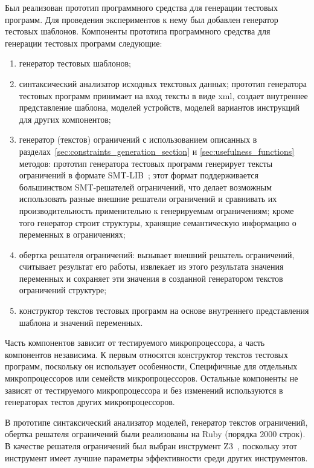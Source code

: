 Был реализован прототип программного средства для генерации тестовых программ. Для проведения экспериментов к нему был добавлен генератор тестовых шаблонов. Компоненты прототипа программного средства для генерации тестовых программ следующие: %
\begin{enumerate}
  \item генератор тестовых шаблонов;
  \item синтаксический анализатор исходных текстовых данных; прототип генератора тестовых программ принимает на вход тексты в виде xml, создает внутреннее представление шаблона, моделей устройств, моделей вариантов инструкций для других компонентов;
  \item генератор (текстов) ограничений с использованием описанных в разделах~\ref{sec:constraints_generation_section} и \ref{sec:usefulness_functions} методов: прототип генератора тестовых программ генерирует тексты ограничений в формате SMT-LIB~\cite{SMT}; этот формат поддерживается большинством SMT-решателей ограничений, что делает возможным использовать разные внешние решатели ограничений и сравнивать их производительность применительно к генерируемым ограничениям; кроме того генератор строит структуры, хранящие семантическую информацию о переменных в ограничениях;
  \item обертка решателя ограничений: вызывает внешний решатель ограничений, считывает результат его работы, извлекает из этого результата значения переменных и сохраняет эти значения в созданной генератором текстов ограничений структуре;
  \item конструктор текстов тестовых программ на основе внутреннего представления шаблона и значений переменных.
\end{enumerate}

Часть компонентов зависит от тестируемого микропроцессора, а часть компонентов независима. К первым относятся конструктор текстов тестовых программ, поскольку он использует особенности, Специфичные для отдельных микропроцессоров или семейств микропроцессоров. Остальные компоненты не зависят от тестируемого микропроцессора и без изменений используются в генераторах тестов других микропроцессоров.

В прототипе синтаксический анализатор моделей, генератор текстов ограничений, обертка решателя ограничений были реализованы на Ruby (порядка 2000 строк). В качестве решателя ограничений был выбран инструмент Z3~\cite{Z3}, поскольку этот инструмент имеет лучшие параметры эффективности среди других инструментов.

